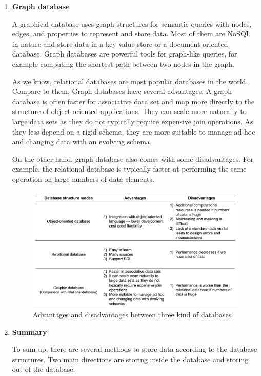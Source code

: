 \begin{enumerate}
	
	\item\textbf{Graph database}
	\setlength{\parindent}{1em}
	
	A graphical database uses graph structures for semantic queries with nodes, edges, and properties to represent and store data. 
	Most of them are NoSQL in nature and store data in a key-value store or a document-oriented database. 
	Graph databases are powerful tools for graph-like queries, for example computing the shortest path between two nodes in the graph.
	
	As we know, relational databases are most popular databases in the world. Compare to them, Graph databases have several advantages. 
	A graph database is often faster for associative data set and map more directly to the structure of object-oriented applications. 
	They can scale more naturally to large data sets as they do not typically require expensive join operations. 
	As they less depend on a rigid schema, they are more suitable to manage ad hoc and changing data with an evolving schema.
	
	On the other hand, graph database also comes with some disadvantages. 
	For example, the relational database is typically faster at performing the same operation on large numbers of data elements.
	
	\begin{figure}[tbh]
		\begin{center}
			\includegraphics[width=\columnwidth]{Wolverine_Method_Chart_2}
		\end{center}
		\caption{Advantages and disadvantages between three kind of databases}
	\end{figure}
	
	\item\textbf{Summary}
	\setlength{\parindent}{1em}
	
    To sum up, there are several methods to store data according to the database structures. 
    Two main directions are storing inside the database and storing out of the database.
    

\end{enumerate}
